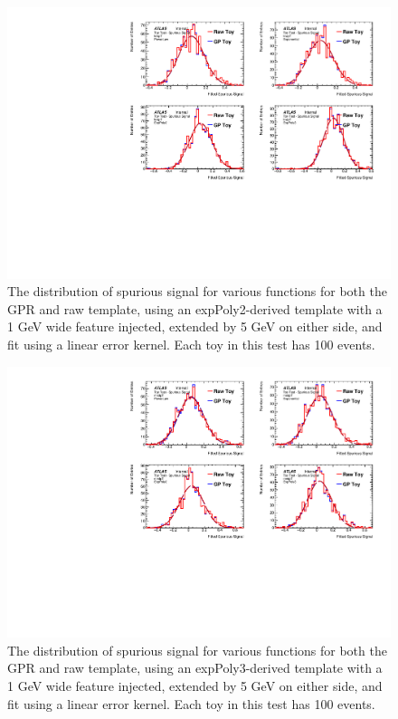\begin{figure} 
\begin{center}
  \includegraphics[width=\textwidth]{figures/background/gpr/validation/linear/ToyTest_FitSigVals_lowpT_100_Sig_1s}   
\caption{The distribution of spurious signal for various functions for both the GPR and raw template, using an expPoly2-derived template with a 1 GeV wide feature injected, extended by 5 GeV on either side, and fit using a linear error kernel. Each toy in this test has 100 events.}
\label{fig:linearkernel_lowpt_100_Sig_1s}
\end{center}
\end{figure}

\begin{figure} 
\begin{center}
  \includegraphics[width=\textwidth]{figures/background/gpr/validation/linear/ToyTest_FitSigVals_medpT_100_Sig_1s}   
\caption{The distribution of spurious signal for various functions for both the GPR and raw template, using an expPoly3-derived template with a 1 GeV wide feature injected, extended by 5 GeV on either side, and fit using a linear error kernel. Each toy in this test has 100 events.}
\label{fig:linearkernel_medpt_100_Sig_1s}
\end{center}
\end{figure}

